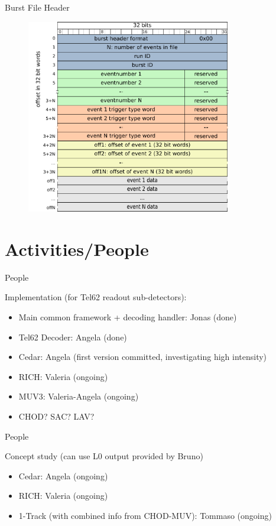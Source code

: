 \begin{frame}{Burst File Header}{}
		\begin{figure}[htbp]
		  \centering
		  \includegraphics[width=0.8\textwidth]{BurstFileHeader.pdf}
		\end{figure}
\end{frame}


\section*{Activities/People}

\begin{frame}{People}{}
	\begin{block}{Implementation (for Tel62 readout sub-detectors):}
		\begin{itemize}
		  \item Main common framework + decoding handler: Jonas (done)
		  \item Tel62 Decoder: Angela (done)
		  \item Cedar: Angela (first version committed, investigating high intensity)
		  \item RICH: Valeria (ongoing)
		  \item MUV3: Valeria-Angela (ongoing)
		  \item CHOD? SAC? LAV?
		\end{itemize}
	\end{block}
\end{frame}

\begin{frame}{People}{}
	\begin{block}{Concept study (can use L0 output provided by Bruno)}
		\begin{itemize}
		  \item Cedar: Angela (ongoing)
		  \item RICH: Valeria (ongoing)
		  \item 1-Track (with combined info from CHOD-MUV): Tommaso (ongoing)
		\end{itemize}
	\end{block}
\end{frame}

